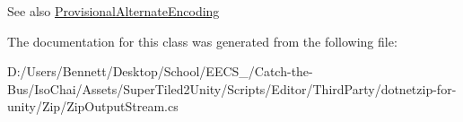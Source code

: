 \begin{DoxySeeAlso}{See also}
\mbox{\hyperlink{class_super_tiled2_unity_1_1_ionic_1_1_zip_1_1_zip_output_stream_aec3ac84c19c3f7c1c7ded0cf4ebba5cf}{Provisional\+Alternate\+Encoding}}


\end{DoxySeeAlso}


The documentation for this class was generated from the following file\+:\begin{DoxyCompactItemize}
\item 
D\+:/\+Users/\+Bennett/\+Desktop/\+School/\+E\+E\+C\+S\+\_/\+Catch-\/the-\/\+Bus/\+Iso\+Chai/\+Assets/\+Super\+Tiled2\+Unity/\+Scripts/\+Editor/\+Third\+Party/dotnetzip-\/for-\/unity/\+Zip/Zip\+Output\+Stream.\+cs\end{DoxyCompactItemize}

